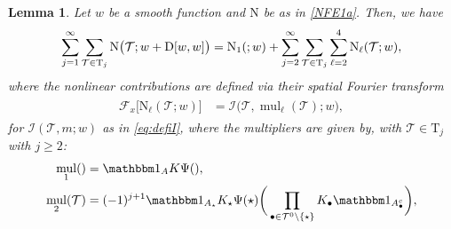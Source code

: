 \documentclass[%
11pt,  reqno]{amsart}
\makeatletter
\newcommand{\5}{\textup{V}}
\newcommand{\ind}{\mathbbm 1}
\newtheorem{lemma}[theorem]{Lemma}
\theoremstyle{remark}
\newcommand{\bul}{\bullet}
\newcommand{\TT}{\mathcal{T}}
\newcommand{\Tr}{\mathrm{T}}
\newcommand{\bfrak}{\mathfrak{b}}
\newcommand{\gfrak}{\mathfrak{g}}
\newcommand{\Ft}{{\mathcal{F}}}
\renewcommand{\l}{\ell}
\DeclareMathOperator{\mul}{mul}
\def\<#1>{\csname MH@symb@#1\endcsname}
\newcommand{\Ical}{\mathcal{I}}
\numberwithin{equation}{section}
\numberwithin{theorem}{section}
\newcommand{\NN}{\mathrm{N}}
\newcommand{\D}{\mathrm{D}}
\makeatother
\begin{document}
\begin{lemma}
\label{LEM:wint}
Let $w$ be a smooth function and $\NN$ be as in \eqref{NFE1a}.
Then, we have
\begin{align}
\label{wint0a}
\sum_{j=1}^\infty \sum_{\TT\in \Tr_j} \NN\big(\TT; w+
\D[w, w]
\big)
=
\NN_1(\<1>;w) + \sum_{j=2}^\infty \sum_{\TT\in\Tr_j} \sum_{\ell=2}^4  \NN_\ell(\TT; w),
\end{align}
where the nonlinear contributions are defined via their spatial Fourier transform
\begin{align}
\label{wint0b}
\begin{split}
\Ft_x \big[ \NN_\ell (\TT; w) \big] & =
\Ical \big(\TT, {\mul}_\l(\TT); w \big),
\end{split}
\end{align}
for $\Ical(\TT, m; w)$ as in \eqref{eq:defiI}, 
%
where the multipliers are given by, 
with $\TT\in \Tr_j$ with $j \ge 2$: %
\begin{align}
    \mul_1(\<1>)&= \ind_A K \Psi(\<1>),\\
    \mul_2(\TT)&=(-1)^{j+1} \ind_{A_\star} K_\star\Psi(\star) \bigg( \prod_{\bul \in \TT^0 \setminus\{\star\}}  K_\bul  \ind_{A_\bul^c} \bigg), 

\end{align}
\end{lemma}
\end{document}
